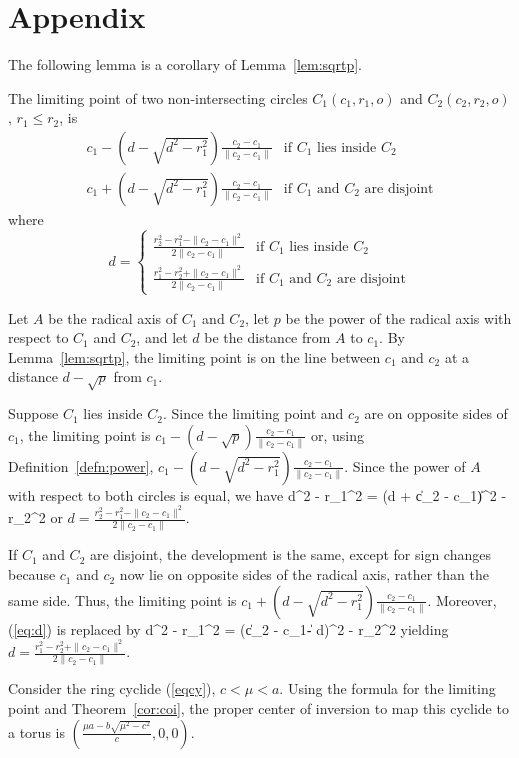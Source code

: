 \section{Appendix}
\label{app}

The following lemma is a corollary of Lemma~\ref{lem:sqrtp}.

\begin{lemma}
\label{limpt}
The limiting point of two non-intersecting circles $C_1(c_1,r_1,o)$ and
$C_2(c_2,r_2,o)$, $r_1 \leq r_2$, is
\[
\begin{array}{ll}
	c_1 - (d - \sqrt{d^2 - r_1^2})  \frac{c_2 - c_1}{\|c_2 - c_1\|} &
		\mbox{if $C_1$ lies inside $C_2$} \\
	c_1 + (d - \sqrt{d^2 - r_1^2})\frac{c_2 - c_1}{\|c_2 - c_1\|} &
		\mbox{if $C_1$ and $C_2$ are disjoint}
\end{array} 
\]
where 
\[
d = \left\{ \begin{array}{ll}
	\frac{r_2^2 - r_1^2 - \|c_2 - c_1\|^2}{2\|c_2 - c_1\|} &
		\mbox{if $C_1$ lies inside $C_2$} \\
	\frac{r_1^2 - r_2^2 + \|c_2 - c_1\|^2}{2\|c_2 - c_1\|} &
		\mbox{if $C_1$ and $C_2$ are disjoint}
\end{array} \right.
\]
\end{lemma}
Let $A$ be the radical axis of $C_1$ and $C_2$,
let $p$ be the power of the radical axis with respect to $C_1$ and $C_2$,
and let $d$ be the distance from $A$ to $c_1$.
By Lemma~\ref{lem:sqrtp},
the limiting point is on the line between $c_1$ and $c_2$ at a distance
$d - \sqrt{p}$ from $c_1$.

Suppose $C_1$ lies inside $C_2$.
Since the limiting point and $c_2$ are on opposite sides of $c_1$,
the limiting point is $c_1 -(d - \sqrt{p})\frac{c_2 - c_1}{\|c_2 - c_1\|}$
or, using Definition~\ref{defn:power},
$c_1 - (d - \sqrt{d^2 - r_1^2})\frac{c_2 - c_1}{\|c_2 - c_1\|}$.
Since the power of $A$ with respect to both circles is equal,
we have
\be
\label{eq:d}
	d^2 - r_1^2 = (d + \|c_2 - c_1\|)^2 - r_2^2
\ee
or $d = \frac{r_2^2 - r_1^2 - \|c_2 - c_1\|^2}{2\|c_2 - c_1\|}$.

If $C_1$ and $C_2$ are disjoint,
the development is the same, except for sign changes because $c_1$ and
$c_2$ now lie on opposite sides of the radical axis, rather than the same side.
Thus, the limiting point is 
$c_1 + (d - \sqrt{d^2 - r_1^2})\frac{c_2 - c_1}{\|c_2 - c_1\|}$.
Moreover, (\ref{eq:d}) is replaced by
\be
	d^2 - r_1^2 = (\|c_2 - c_1\| - d)^2 - r_2^2
\ee
yielding $d = \frac{r_1^2 - r_2^2 + \|c_2 - c_1\|^2}{2\|c_2 - c_1\|}$.
\QED

\begin{example}
Consider the ring cyclide (\ref{eqcy}), $c < \mu < a$.
Using the formula for the limiting point and Theorem~\ref{cor:coi},
the proper center of inversion to map this cyclide to a torus is 
$(\frac{\mu a - b \sqrt{\mu^2 - c^2}}{c},0,0)$.
\end{example}

